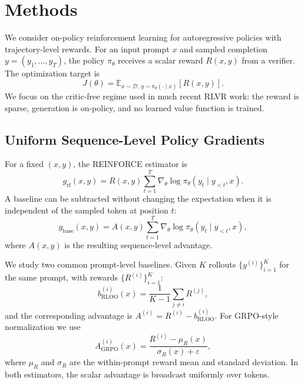 \section{Methods}\label{sec:methods}

We consider on-policy reinforcement learning for autoregressive policies with trajectory-level rewards. For an input prompt $x$ and sampled completion $y = (y_1, \ldots, y_T)$, the policy $\pi_\theta$ receives a scalar reward $R(x,y)$ from a verifier. The optimization target is
\begin{equation}
J(\theta) = \mathbb{E}_{x \sim \mathcal{D},\, y \sim \pi_\theta(\cdot \mid x)}[R(x,y)].
\end{equation}
We focus on the critic-free regime used in much recent RLVR work: the reward is sparse, generation is on-policy, and no learned value function is trained.

\subsection{Uniform Sequence-Level Policy Gradients}

For a fixed $(x,y)$, the REINFORCE estimator is
\begin{equation}
 g_{\mathrm{rf}}(x,y) = R(x,y) \sum_{t=1}^{T} \nabla_\theta \log \pi_\theta(y_t \mid y_{<t}, x).
\end{equation}
A baseline can be subtracted without changing the expectation when it is independent of the sampled token at position $t$:
\begin{equation}
 g_{\mathrm{base}}(x,y) = A(x,y) \sum_{t=1}^{T} \nabla_\theta \log \pi_\theta(y_t \mid y_{<t}, x),
\end{equation}
where $A(x,y)$ is the resulting sequence-level advantage.

We study two common prompt-level baselines. Given $K$ rollouts $\{y^{(i)}\}_{i=1}^{K}$ for the same prompt, with rewards $\{R^{(i)}\}_{i=1}^{K}$:
\begin{equation}
 b_{\mathrm{RLOO}}^{(i)}(x) = \frac{1}{K-1}\sum_{j \neq i} R^{(j)},
\end{equation}
and the corresponding advantage is $A^{(i)} = R^{(i)} - b_{\mathrm{RLOO}}^{(i)}$. For GRPO-style normalization we use
\begin{equation}
 A_{\mathrm{GRPO}}^{(i)}(x) = \frac{R^{(i)} - \mu_R(x)}{\sigma_R(x) + \varepsilon},
\end{equation}
where $\mu_R$ and $\sigma_R$ are the within-prompt reward mean and standard deviation. In both estimators, the scalar advantage is broadcast uniformly over tokens.

